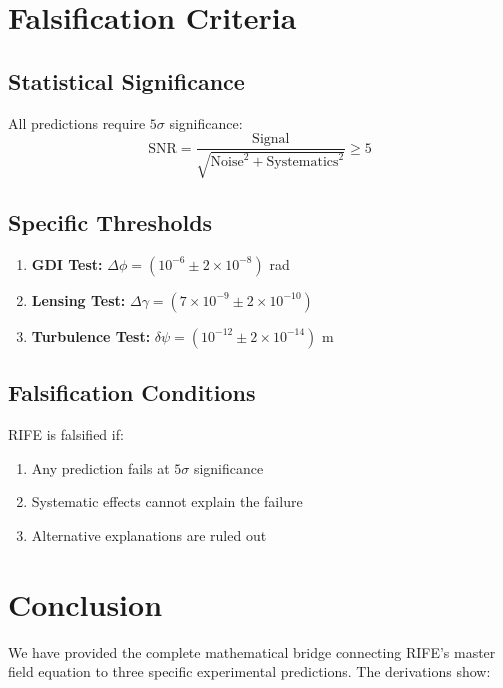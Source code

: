 \documentclass[11pt]{article}
\begin{document}
\section{Falsification Criteria}

\subsection{Statistical Significance}
All predictions require $5\sigma$ significance:
\begin{equation}
\text{SNR} = \frac{\text{Signal}}{\sqrt{\text{Noise}^2 + \text{Systematics}^2}} \geq 5
\end{equation}

\subsection{Specific Thresholds}
\begin{enumerate}
\item \textbf{GDI Test:} $\Delta\phi = (10^{-6} \pm 2 \times 10^{-8})$ rad
\item \textbf{Lensing Test:} $\Delta\gamma = (7 \times 10^{-9} \pm 2 \times 10^{-10})$
\item \textbf{Turbulence Test:} $\delta\psi = (10^{-12} \pm 2 \times 10^{-14})$ m
\end{enumerate}

\subsection{Falsification Conditions}
RIFE is falsified if:
\begin{enumerate}
\item Any prediction fails at $5\sigma$ significance
\item Systematic effects cannot explain the failure
\item Alternative explanations are ruled out
\end{enumerate}

\section{Conclusion}

We have provided the complete mathematical bridge connecting RIFE's master field equation to three specific experimental predictions. The derivations show:
\end{document}
